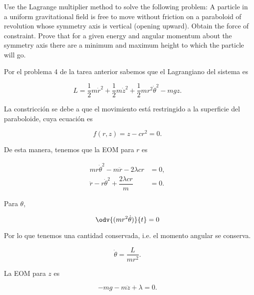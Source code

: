 \documentclass[../main.tex]{subfiles}
\begin{document}
\begin{problema}
	Use the Lagrange multiplier method to solve the following problem: A
	particle in a uniform gravitational field is free to move without
	friction on a paraboloid of revolution whose symmetry axis is vertical
	(opening upward). Obtain the force of constraint. Prove that for a
	given energy and angular momentum about the symmetry axis there are
	a minimum and maximum height to which the particle will go.

	\startsolution

	Por el problema 4 de la tarea anterior sabemos que el Lagrangiano del
	sistema es

	\begin{equation}
		L = \dfrac{1}{2}m \dot{r}^{2} + \dfrac{1}{2}m \dot{z}^{2} + \dfrac{1}{2}mr^{2} \dot{\theta}^{2}
		- mgz.
		\label{eq:lagrangian-p3}
	\end{equation}

	La constricción se debe a que el movimiento está restringido a la superficie del
	paraboloide, cuya ecuación es

	\begin{equation*}
		f(r, z) = z - cr^{2} = 0.
	\end{equation*}

	De esta manera, tenemos que la EOM para \(r\) es

	\begin{align}
		mr \dot{\theta}^{2} - m \ddot{r} - 2\lambda cr         & = 0,\nonumber \\
		\ddot{r} - r \dot{\theta}^{2} + \dfrac{2\lambda cr}{m} & = 0.
		\label{eq:eom-r}
	\end{align}

	Para \(\theta\),

	\begin{equation*}
		\odv{(mr^{2}\dot{\theta})}{t} = 0
	\end{equation*}

	Por lo que tenemos una cantidad conservada, i.e. el momento angular se conserva.

	\begin{equation}
		\dot{\theta} = \dfrac{L}{mr^{2}}.
		\label{eq:conservation-angular-momentum}
	\end{equation}

	La EOM para \(z\) es

	\begin{equation}
		-mg - m \ddot{z} + \lambda = 0.
		\label{eq:eom-z-p3}
	\end{equation}


\end{problema}
\end{document}
